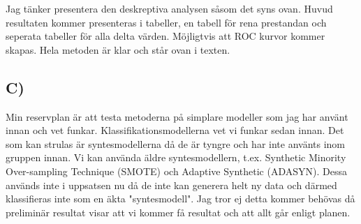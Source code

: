 \documentclass[12pt, a4paper]{article}
\begin{document}
Jag tänker presentera den deskreptiva analysen såsom det syns ovan. Huvud resultaten kommer presenteras i tabeller, en tabell för rena prestandan och seperata tabeller för alla delta värden. Möjligtvis att ROC kurvor kommer skapas. Hela metoden är klar och står ovan i texten.

\subsection{C)}
Min reservplan är att testa metoderna på simplare modeller som jag har använt innan och vet funkar. Klassifikationsmodellerna vet vi funkar sedan innan. Det som kan strulas är syntesmodellerna då de är tyngre och har inte använts inom gruppen innan. Vi kan använda äldre syntesmodellern, t.ex. Synthetic Minority Over-sampling Technique (SMOTE) och Adaptive Synthetic (ADASYN). Dessa används inte i uppsatsen nu då de inte kan generera helt ny data och därmed klassifieras inte som en äkta "syntesmodell". Jag tror ej detta kommer behövas då preliminär resultat visar att vi kommer få resultat och att allt går enligt planen.
\end{document}
